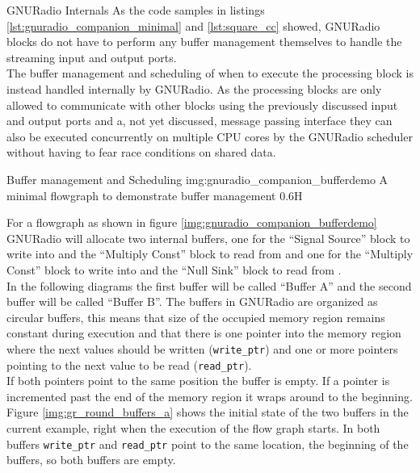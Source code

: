 \begin{subchapter}{GNURadio Internals}
  As the code samples in listings \ref{lst:gnuradio_companion_minimal}
  and \ref{lst:square_cc} showed, GNURadio blocks do not have to
  perform any buffer management themselves to handle the streaming
  input and output ports. \\

  The buffer management and scheduling of when to execute the processing
  block is instead handled internally by GNURadio.
  As the processing blocks are only allowed to communicate with
  other blocks using the previously discussed input and output ports
  and a, not yet discussed, message passing interface they can also
  be executed concurrently on multiple CPU cores by the GNURadio scheduler
  without having to fear race conditions on shared data. \\

  \begin{subsubchapter}{Buffer management and Scheduling}
                    {img:gnuradio_companion_bufferdemo}
                    {A minimal flowgraph to demonstrate buffer management}
                    {0.6}{H}

    For a flowgraph as shown in figure \ref{img:gnuradio_companion_bufferdemo}
    GNURadio will allocate two internal buffers, one for the ``Signal Source'' block
    to write into and the ``Multiply Const'' block to read from and one for the
    ``Multiply Const'' block to write into and the ``Null Sink'' block to
    read from \cite{grblogbuffers}. \\

    In the following diagrams the first buffer will be called ``Buffer A''
    and the second buffer will be called ``Buffer B''.
    The buffers in GNURadio are organized as circular buffers, this means
    that size of the occupied memory region remains constant during execution
    and that there is one pointer into the memory region where the next
    values should be written (\texttt{write\_ptr}) and one or more
    pointers pointing to the next value to be read (\texttt{read\_ptr}). \\

    If both pointers point to the same position the buffer is empty.
    If a pointer is incremented past the end of the memory region
    it wraps around to the beginning. \\

    Figure \ref{img:gr_round_buffers_a} shows the initial state of the
    two buffers in the current example, right when the execution of the
    flow graph starts.
    In both buffers \texttt{write\_ptr} and \texttt{read\_ptr}
    point to the same location, the beginning of the buffers,
    so both buffers are empty.


\end{subsubchapter}
\end{subchapter}
